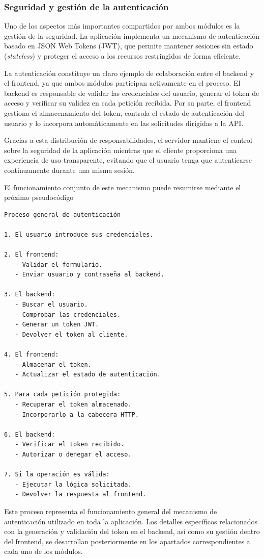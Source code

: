 \subsubsection{Seguridad y gestión de la autenticación}

Uno de los aspectos más importantes compartidos por ambos módulos es la gestión de la seguridad. La aplicación implementa un mecanismo de autenticación basado en JSON Web Tokens (JWT), que permite mantener sesiones sin estado (\textit{stateless}) y proteger el acceso a los recursos restringidos de forma eficiente.

La autenticación constituye un claro ejemplo de colaboración entre el backend y el frontend, ya que ambos módulos participan activamente en el proceso. El backend es responsable de validar las credenciales del usuario, generar el token de acceso y verificar su validez en cada petición recibida. Por su parte, el frontend gestiona el almacenamiento del token, controla el estado de autenticación del usuario y lo incorpora automáticamente en las solicitudes dirigidas a la API.

Gracias a esta distribución de responsabilidades, el servidor mantiene el control sobre la seguridad de la aplicación mientras que el cliente proporciona una experiencia de uso transparente, evitando que el usuario tenga que autenticarse continuamente durante una misma sesión.

El funcionamiento conjunto de este mecanismo puede resumirse mediante el próximo pseudocódigo

\begin{Verbatim}[frame=single, fontsize=\small]
Proceso general de autenticación

1. El usuario introduce sus credenciales.

2. El frontend:
   - Validar el formulario.
   - Enviar usuario y contraseña al backend.

3. El backend:
   - Buscar el usuario.
   - Comprobar las credenciales.
   - Generar un token JWT.
   - Devolver el token al cliente.

4. El frontend:
   - Almacenar el token.
   - Actualizar el estado de autenticación.

5. Para cada petición protegida:
   - Recuperar el token almacenado.
   - Incorporarlo a la cabecera HTTP.

6. El backend:
   - Verificar el token recibido.
   - Autorizar o denegar el acceso.

7. Si la operación es válida:
   - Ejecutar la lógica solicitada.
   - Devolver la respuesta al frontend.
\end{Verbatim}
\newpage
Este proceso representa el funcionamiento general del mecanismo de autenticación utilizado en toda la aplicación. Los detalles específicos relacionados con la generación y validación del token en el backend, así como su gestión dentro del frontend, se desarrollan posteriormente en los apartados correspondientes a cada uno de los módulos.

